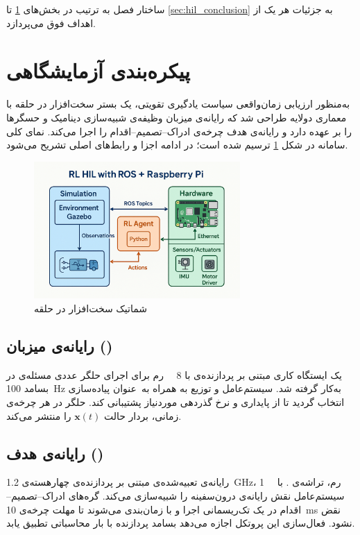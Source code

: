 	ساختار فصل به ترتیب در بخش‌های \ref{sec:hil_setup} تا \ref{sec:hil_conclusion} به جزئیات هر یک از اهداف فوق می‌پردازد.
	
	
	\section{پیکره‌بندی آزمایشگاهی}\label{sec:hil_setup}
	
	به‌منظور ارزیابی زمان‌واقعی
	 سیاست یادگیری تقویتی، یک بستر {سخت‌افزار در حلقه} با معماری دولایه طراحی شد که رایانه‌ی میزبان وظیفه‌ی شبیه‌سازی دینامیک و حسگرها را بر عهده دارد و رایانه‌ی هدف چرخه‌ی ادراک–تصمیم–اقدام را اجرا می‌کند. نمای کلی سامانه در شکل \ref{fig:hil_architecture} ترسیم شده است؛ در ادامه اجزا و رابط‌های اصلی تشریح می‌شود.
	
	
	\begin{figure}[H]
		\centering
		\includegraphics[width=0.7\textwidth]{../Figure/HIL/gpt_HIL.png}
		\caption{شماتیک سخت‌افزار در حلقه}
		\label{fig:hil_architecture}
	\end{figure}
	
	\subsection{رایانه‌ی میزبان ()}
	یک ایستگاه کاری مبتنی بر پردازنده‌ی  با \SI{8}{\gibi\byte} رم برای اجرای حلگر عددی مسئله‌ی  در بسامد \SI{100}{\hertz} به‌کار گرفته شد. سیستم‌عامل  و توزیع
	  به همراه  به عنوان پیاده‌سازی  انتخاب گردید تا از پایداری و نرخ گذردهی موردنیاز پشتیبانی کند. حلگر در هر چرخه‌ی زمانی، بردار حالت $\mathbf{x}(t)$  را منتشر می‌کند.
	
	\subsection{رایانه‌ی هدف ()}
	رایانه‌ی تعبیه‌شده‌ی
مبتنی بر پردازنده‌ی
چهارهسته‌ی   \SI{1.2}{\giga\hertz}، \SI{1}{\gibi\byte} رم، تراشه‌ی .
 با سیستم‌عامل  نقش رایانه‌ی درون‌سفینه را شبیه‌سازی می‌کند. گره‌های
 ادراک–تصمیم–اقدام
 در یک 
  تک‌ریسمانی اجرا و با  زمان‌بندی می‌شوند تا مهلت چرخه‌ی \SI{10}{\milli\second} نقض نشود. فعال‌سازی
این پروتکل
    اجازه می‌دهد بسامد پردازنده با بار محاسباتی تطبیق یابد.
	
